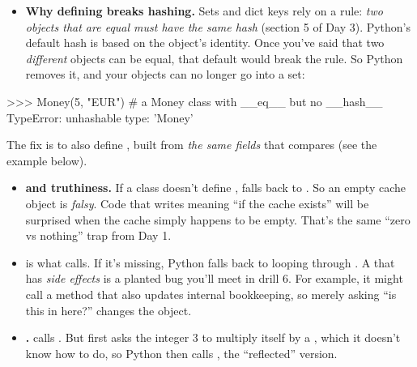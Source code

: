 \documentclass[10pt,a4paper]{article}
\begin{document}
\begin{itemize}
\item \textbf{Why defining  breaks hashing.} Sets and dict keys rely on a rule: \emph{two objects that are equal must have the same hash} (section 5 of Day 3). Python’s default hash is based on the object’s identity. Once you’ve said that two \emph{different} objects can be equal, that default would break the rule. So Python removes it, and your objects can no longer go into a set:
\end{itemize}
\begin{txtcode}
  >>> {Money(5, "EUR")}        # a Money class with __eq__ but no __hash__
  TypeError: unhashable type: 'Money'
\end{txtcode}
The fix is to also define , built from \emph{the same fields} that  compares (see the example below).
\begin{itemize}
\item \textbf{ and truthiness.} If a class doesn’t define ,  falls back to . So an empty cache object is \emph{falsy}. Code that writes  meaning “if the cache exists” will be surprised when the cache simply happens to be empty. That’s the same “zero vs nothing” trap from Day 1.
\end{itemize}
\begin{itemize}
\item \textbf{} is what  calls. If it’s missing, Python falls back to looping through . A  that has \emph{side effects} is a planted bug you’ll meet in drill 6. For example, it might call a  method that also updates internal bookkeeping, so merely asking “is this in here?” changes the object.
\end{itemize}
\begin{itemize}
\item \textbf{.}  calls . But  first asks the integer 3 to multiply itself by a , which it doesn’t know how to do, so Python then calls , the “reflected” version.
\end{itemize}
\end{document}

